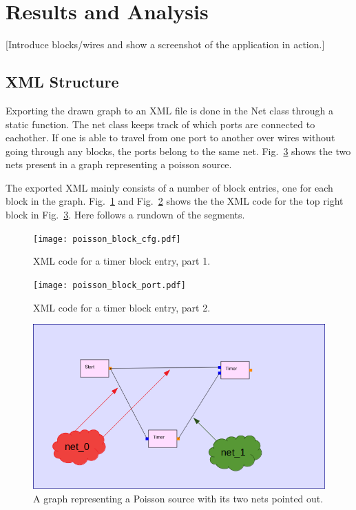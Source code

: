 \documentclass[journal,comsoc]{IEEEtran}
\begin{document}
\section{Results and Analysis}
[Introduce blocks/wires and show a screenshot of the application in action.]
\subsection{XML Structure}
Exporting the drawn graph to an XML file is done in the Net class through a static function.
The net class keeps track of which ports are connected to eachother. If one is able to
travel from one port to another over wires without going through any blocks, the ports
belong to the same net. Fig.~\ref{fig:net} shows the two nets present in a graph representing
a poisson source.

The exported XML mainly consists of a number of block entries, one for each block in the graph.
Fig.~\ref{fig:xml1} and Fig.~\ref{fig:xml2} shows the the XML code for the top right block in
Fig.~\ref{fig:net}. Here follows a rundown of the segments.
\begin{figure}[!t]
    \centering
    \texttt{[image: poisson\_block\_cfg.pdf]}
    \caption{XML code for a timer block entry, part 1.}
    \label{fig:xml1}
\end{figure}
\begin{figure}[!t]
    \centering
    \texttt{[image: poisson\_block\_port.pdf]}
    \caption{XML code for a timer block entry, part 2.}
    \label{fig:xml2}
\end{figure}
\begin{figure}[!t]
    \centering
    \includegraphics[width=\columnwidth]{poisson_nets.png}
    \caption{A graph representing a Poisson source with its two nets pointed out.}
    \label{fig:net}
\end{figure}
\end{document}

